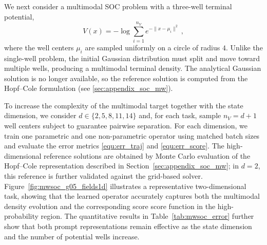 \documentclass[preprint]{elsarticle}
\newcommand{\m}{\mu}
\begin{document}
We next consider a multimodal SOC problem with a three-well terminal potential,
\[
    V(x)=-\log\sum_{i=1}^{n_V}e^{-\|x-\m_i\|^2}
    \ ,
\]
where the well centers $\m_i$ are sampled uniformly on a circle of radius $4$. Unlike the single-well problem, the initial Gaussian distribution must split and move toward multiple wells, producing a multimodal terminal density. The analytical Gaussian solution is no longer available, so the reference solution is computed from the Hopf--Cole formulation (see \ref{sec:appendix_soc_mw}).

To increase the complexity of the multimodal target together with the state dimension, we consider $d\in\{2,5,8,11,14\}$ and, for each task, sample $n_V=d+1$ well centers subject to guarantee pairwise separation. For each dimension, we train one parametric and one non-parametric operator using matched batch sizes and evaluate the error metrics \eqref{equ:err_traj} and \eqref{equ:err_score}. The high-dimensional reference solutions are obtained by Monte Carlo evaluation of the Hopf--Cole representation described in Section~\ref{sec:appendix_soc_mw}; in $d=2$, this reference is further validated against the grid-based solver. Figure~\ref{fig:mwsoc_g05_fields1d} illustrates a representative two-dimensional task, showing that the learned operator accurately captures both the multimodal density evolution and the corresponding score score function in the high-probability region. The quantitative results in Table~\ref{tab:mwsoc_error} further show that both prompt representations remain effective as the state dimension and the number of potential wells increase.
\end{document}
